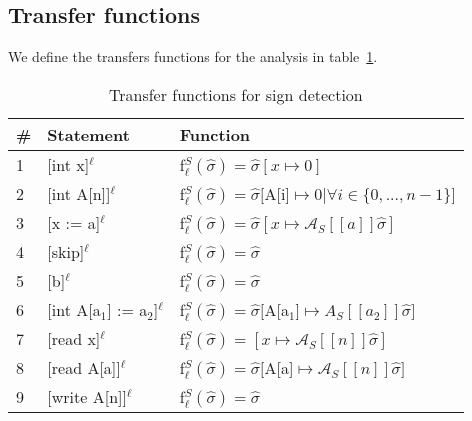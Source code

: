 \subsection{Transfer functions}
We define the transfers functions for the analysis in table~\ref{table:sign_detection_functions}.
\begin{table}[H]
\begin{tabular}{| l | l | l |}
  \hline
  \# & Statement & Function \\
  \hline
  \hline
  1 & [int x]$^\ell$ & f$_\ell^S (\widehat{\sigma}) = \widehat{\sigma}[x \mapsto {0}]$ \\
  \hline
  2 & [int A[n]]$^\ell$ & f$_\ell^S (\widehat{\sigma}) =  \widehat{\sigma}[$A[i]$ \mapsto {0} | \forall i \in \{0, ..., n-1 \}]$\\
  \hline
  3 & [x := a]$^\ell$ & f$_\ell^S (\widehat{\sigma}) = \widehat{\sigma}[x \mapsto \mathcal{A}_S[\![a]\!] \widehat{\sigma} ]$ \\
  \hline
  4 & [skip]$^\ell$ & f$_\ell^S (\widehat{\sigma}) = \widehat{\sigma}$\\
  \hline
  5 & [b]$^\ell$ & f$_\ell^S (\widehat{\sigma}) = \widehat{\sigma}$\\
  \hline
  6 & [int A[a$_1$] := a$_2$]$^\ell$ & f$_\ell^S (\widehat{\sigma}) = \widehat{\sigma}[$A[a$_1$]$ \mapsto A_S[\![a_2]\!]\widehat{\sigma}]$\\
  \hline
  7 & [read x]$^\ell$ & f$_\ell^S (\widehat{\sigma}) = [x \mapsto \mathcal{A}_S [\![n]\!] \widehat{\sigma}]$ \\
  \hline
  8 & [read A[a]]$^\ell$ & f$_\ell^S (\widehat{\sigma}) = \widehat{\sigma}[$A[a]$ \mapsto \mathcal{A}_S[\![n]\!]\widehat{\sigma}]$\\
  \hline
  9 & [write A[n]]$^\ell$ & f$_\ell^S (\widehat{\sigma}) = \widehat{\sigma}$\\
  \hline
\end{tabular}
\centering
\caption{Transfer functions for sign detection}
\label{table:sign_detection_functions}
\end{table}

